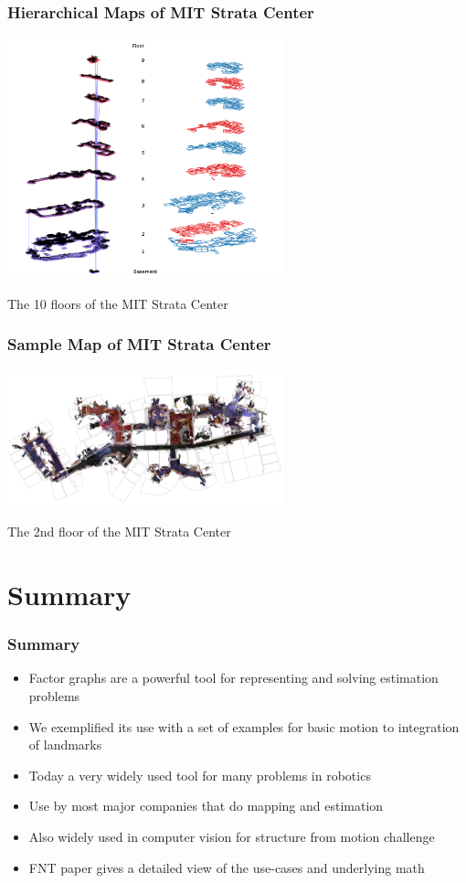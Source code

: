 \documentclass[10pt]{beamer}
\begin{document}
\begin{frame}
  \frametitle{Hierarchical Maps of MIT Strata Center}
  \centerline{\includegraphics[width=8cm]{mit-strata-floors.png}}
  \centerline{The 10 floors of the MIT Strata Center}
\end{frame}

\begin{frame}
  \frametitle{Sample Map of MIT Strata Center}
  \centerline{\includegraphics[width=8cm]{mit-strata-2nd-floor.png}}
  \centerline{The 2nd floor of the MIT Strata Center}
\end{frame}

\section{Summary}
\begin{frame}
  \frametitle{Summary}
  \begin{itemize}
    \item Factor graphs are a powerful tool for representing and solving estimation problems
    \item We exemplified its use with a set of examples for basic motion to
          integration of landmarks
    \item Today a very widely used tool for many problems in robotics
    \item Use by most major companies that do mapping and estimation
    \item Also widely used in computer vision for structure from motion challenge
    \item FNT paper gives a detailed view of the use-cases and underlying math
  \end{itemize}
  

\end{frame}
\end{document}
